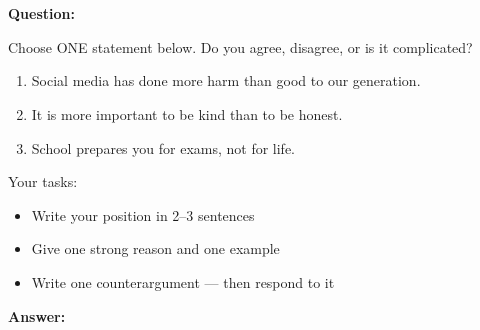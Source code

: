 \documentclass[]{../../../tex/classes/styledArticle}
\begin{document}
	\section{}
	\textbf{Question: }
	
	Choose ONE statement below. Do you agree, disagree, or is it complicated?
	\begin{enumerate}
		\item Social media has done more harm than good to our generation.
		\item It is more important to be kind than to be honest.
		\item School prepares you for exams, not for life.
	\end{enumerate}
	Your tasks:
	\begin{itemize}
		\item Write your position in 2–3 sentences
		\item Give one strong reason and one example
		\item Write one counterargument — then respond to it
	\end{itemize}
	\textbf{Answer: }
\end{document}
